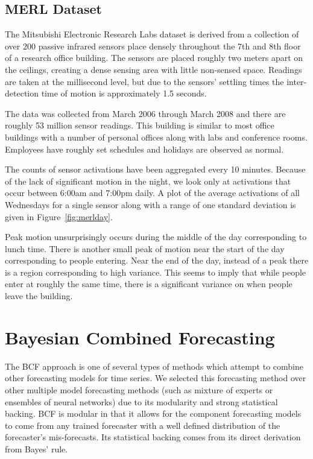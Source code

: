 \documentclass{acm_proc_article-sp}
\begin{document}
\subsection{MERL Dataset} 

The Mitsubishi Electronic Research Labs dataset is derived from a collection of over 200 passive infrared sensors place densely throughout the 7th and 8th floor of a research office building.  The sensors are placed roughly two meters apart on the ceilings, creating a dense sensing area with little non-sensed space.  Readings are taken at the millisecond level, but due to the sensors' settling times the inter-detection time of motion is approximately 1.5 seconds.

The data was collected from March 2006 through March 2008 and there are roughly 53 million sensor readings.  This building is similar to most office buildings with a number of personal offices along with labs and conference rooms.  Employees have roughly set schedules and holidays are observed as normal. 

The counts of sensor activations have been aggregated every 10 minutes.  Because of the lack of significant motion in the night, we look only at activations that occur between 6:00am and 7:00pm daily.  A plot of the average activations of all Wednesdays for a single sensor along with a range of one standard deviation is given in Figure~\ref{fig:merlday}.  

Peak motion unsurprisingly occurs during the middle of the day corresponding to lunch time.  There is another small peak of motion near the start of the day corresponding to people entering.  Near the end of the day, instead of a peak there is a region corresponding to high variance.  This seems to imply that while people enter at roughly the same time, there is a significant variance on when people leave the building.


\section{Bayesian Combined Forecasting}
The BCF approach \cite{Petridis2001} is one of several types of methods which attempt to combine other forecasting models for time series. We selected this forecasting method over other multiple model forecasting methods (such as mixture of experts or ensembles of neural networks) due to its modularity and strong statistical backing.  BCF is modular in that it allows for the component forecasting models to come from any trained forecaster with a well defined distribution of the forecaster's mis-forecasts.  Its statistical backing comes from its direct derivation from Bayes' rule.
\end{document}
